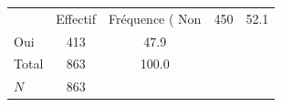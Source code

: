 {
\def\sym#1{\ifmmode^{#1}\else\(^{#1}\)\fi}
\begin{tabular}{l*{1}{cc}}
\toprule
            &    Effectif&Fréquence (%
\midrule
Non         &         450&        52.1\\
Oui         &         413&        47.9\\
Total       &         863&       100.0\\
\midrule
\(N\)       &         863&            \\
\bottomrule
\end{tabular}
}
